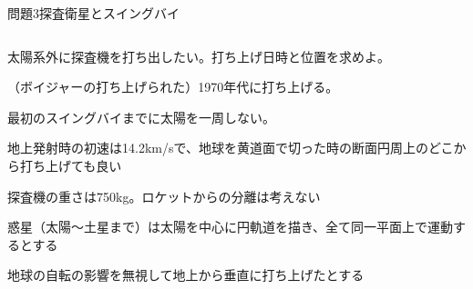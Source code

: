 \documentclass[dvipdfmx]{beamer}
\newenvironment{wideitemize}{\itemize\setlength{\itemsep}{1em}}{\enditemize}
\newenvironment{wideitemize2}{\itemize\setlength{\itemsep}{0.2em}}{\enditemize}
\begin{document}

\begin{frame}{問題3}{探査衛星とスイングバイ}
\begin{columns}[t]
\begin{column}{0.7\textwidth}
\begin{wideitemize}
	\item 太陽系外に探査機を打ち出したい。打ち上げ日時と位置を求めよ。
	\begin{wideitemize2}
		\item （ボイジャーの打ち上げられた）1970年代に打ち上げる。
		\item 最初のスイングバイまでに太陽を一周しない。
		\item 地上発射時の初速は14.2km/sで、地球を黄道面で切った時の断面円周上のどこから打ち上げても良い
		\item 探査機の重さは750kg。ロケットからの分離は考えない
		\item 惑星（太陽～土星まで）は太陽を中心に円軌道を描き、全て同一平面上で運動するとする
		\item 地球の自転の影響を無視して地上から垂直に打ち上げたとする
	\end{wideitemize2}
\end{wideitemize}


\end{column}
\end{columns}
\end{frame}
\end{document}
